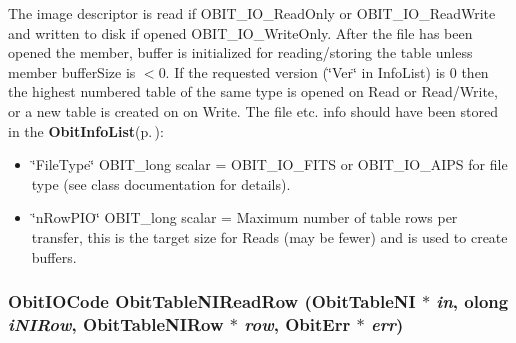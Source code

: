 The image descriptor is read if OBIT\_\-IO\_\-Read\-Only or OBIT\_\-IO\_\-Read\-Write and written to disk if opened OBIT\_\-IO\_\-Write\-Only. After the file has been opened the member, buffer is initialized for reading/storing the table unless member buffer\-Size is $<$0. If the requested version (\char`\"{}Ver\char`\"{} in Info\-List) is 0 then the highest numbered table of the same type is opened on Read or Read/Write, or a new table is created on on Write. The file etc. info should have been stored in the {\bf Obit\-Info\-List}{\rm (p.\,\pageref{structObitInfoList})}: \begin{itemize}
\item \char`\"{}File\-Type\char`\"{} OBIT\_\-long scalar = OBIT\_\-IO\_\-FITS or OBIT\_\-IO\_\-AIPS for file type (see class documentation for details). \item \char`\"{}n\-Row\-PIO\char`\"{} OBIT\_\-long scalar = Maximum number of table rows per transfer, this is the target size for Reads (may be fewer) and is used to create buffers. 
\end{itemize}
\subsubsection{\setlength{\rightskip}{0pt plus 5cm}Obit\-IOCode Obit\-Table\-NIRead\-Row ({\bf Obit\-Table\-NI} $\ast$ {\em in}, {\bf olong} {\em i\-NIRow}, {\bf Obit\-Table\-NIRow} $\ast$ {\em row}, {\bf Obit\-Err} $\ast$ {\em err})}\label{ObitTableNI_8c_a22}


